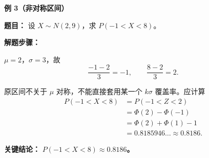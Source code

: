 \clearpage


\begin{examplebox}
	\textbf{\textcolor{CExample}{例 3（非对称区间）}}

	\textbf{\textcolor{CExample}{题目：}}
	设 $X\sim N(2,9)$，求 $P(-1<X<8)$。

	\textbf{\textcolor{CExample}{解题步骤：}}
	\begin{description}[style=nextline, leftmargin=2.8em, labelsep=0.5em, itemsep=0.45em]
		\item[\textbf{第一步（标准化两个端点）：}]
			$\mu=2$，$\sigma=3$，故
			\[
				\frac{-1-2}{3}=-1,
				\qquad
				\frac{8-2}{3}=2.
			\]
		\item[\textbf{第二步（用分布函数作差）：}]
			原区间不关于 $\mu$ 对称，不能直接套用某一个 $k\sigma$ 覆盖率。应计算
			\[
				\begin{aligned}
					P(-1<X<8)
					&=P(-1<Z<2)\\
					&=\Phi(2)-\Phi(-1)\\
					&=\Phi(2)+\Phi(1)-1\\
					&=0.8185946\ldots\approx0.8186.
				\end{aligned}
			\]
	\end{description}
	\textbf{\textcolor{CExample}{关键结论：}}
	\textbf{$P(-1<X<8)\approx0.8186$。}
\end{examplebox}
